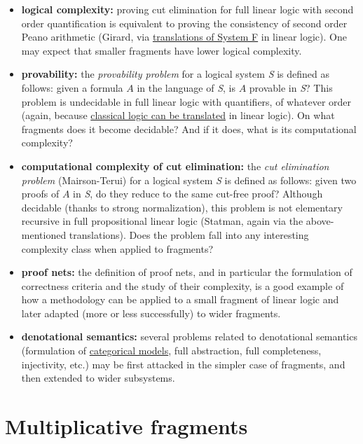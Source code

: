 \begin{itemize}
\item
  \textbf{logical complexity:} proving cut elimination for full linear
  logic with second order quantification is equivalent to proving the
  consistency of second order Peano arithmetic (Girard, via
  \hyperref[translations-of-intuitionistic-logic]{translations of System F}
  in linear logic). One may expect that smaller fragments have lower
  logical complexity.
\item
  \textbf{provability:} the \emph{provability problem} for a logical
  system \emph{S} is defined as follows: given a formula \(A\) in the
  language of \emph{S}, is \(A\) provable in \emph{S}? This problem is
  undecidable in full linear logic with quantifiers, of whatever order
  (again, because \hyperref[translations-of-classical-logic]{classical logic
  can be translated} in linear logic). On what fragments does it become
  decidable? And if it does, what is its computational complexity?
\item
  \textbf{computational complexity of cut elimination:} the \emph{cut
  elimination problem} (Mairson-Terui) for a logical system \emph{S} is
  defined as follows: given two proofs of \(A\) in \emph{S}, do they
  reduce to the same cut-free proof? Although decidable (thanks to
  strong normalization), this problem is not elementary recursive in
  full propositional linear logic (Statman, again via the
  above-mentioned translations). Does the problem fall into any
  interesting complexity class when applied to fragments?
\item
  \textbf{proof nets:} the definition of proof nets, and in particular
  the formulation of correctness criteria and the study of their
  complexity, is a good example of how a methodology can be applied to a
  small fragment of linear logic and later adapted (more or less
  successfully) to wider fragments.
\item
  \textbf{denotational semantics:} several problems related to
  denotational semantics (formulation of
  \hyperref[categorical-semantics]{categorical models}, full abstraction,
  full completeness, injectivity, etc.) may be first attacked in the
  simpler case of fragments, and then extended to wider subsystems.
\end{itemize}

\section{Multiplicative fragments}\label{multiplicative-fragments}


